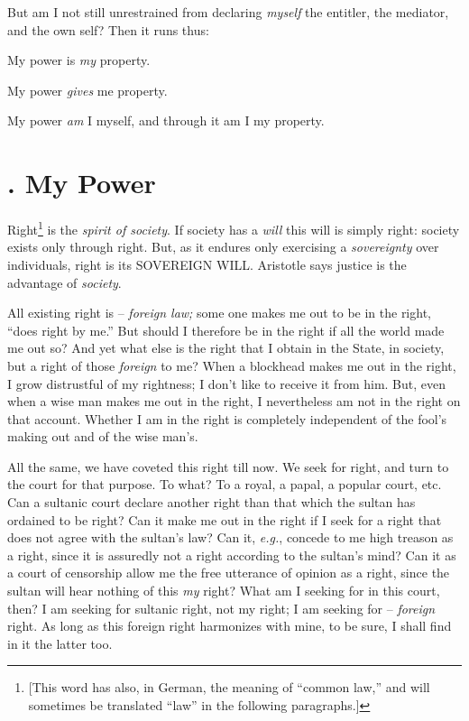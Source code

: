 \documentclass[12pt,a4paper]{book}
\begin{document}
But am I not still unrestrained from declaring \textit{myself} the entitler, 
the mediator, and the own self? Then it runs thus:

My power is \textit{my} property.

My power \textit{gives} me property.

My power \textit{am} I myself, and through it am I my property.

\section[1. My Power]{. My Power}

Right\footnote{[This word has also, in German, the meaning of ``common 
law,'' and will sometimes be translated ``law'' in the following 
paragraphs.]} is the \textit{spirit of society}. If society has a 
\textit{will} this will is simply right: society exists only through right. 
But, as it endures only exercising a \textit{sovereignty} over individuals, 
right is its SOVEREIGN WILL. Aristotle says justice is the advantage of 
\textit{society}.

All existing right is -- \textit{foreign law;} some one makes me out to be in 
the right, ``does right by me.'' But should I therefore be in the right if 
all the world made me out so? And yet what else is the right that I obtain in 
the State, in society, but a right of those \textit{foreign} to me? When a 
blockhead makes me out in the right, I grow distrustful of my rightness; I 
don't like to receive it from him. But, even when a wise man makes me out in 
the right, I nevertheless am not in the right on that account. Whether I am in 
the right is completely independent of the fool's making out and of the wise 
man's.

All the same, we have coveted this right till now. We seek for right, and turn 
to the court for that purpose. To what? To a royal, a papal, a popular court, 
etc. Can a sultanic court declare another right than that which the sultan has 
ordained to be right? Can it make me out in the right if I seek for a right 
that does not agree with the sultan's law? Can it, \textit{e.g.}, concede to 
me high treason as a right, since it is assuredly not a right according to the 
sultan's mind? Can it as a court of censorship allow me the free utterance of 
opinion as a right, since the sultan will hear nothing of this \textit{my} 
right? What am I seeking for in this court, then? I am seeking for sultanic 
right, not my right; I am seeking for -- \textit{foreign} right. As long as 
this foreign right harmonizes with mine, to be sure, I shall find in it the 
latter too.
\end{document}
